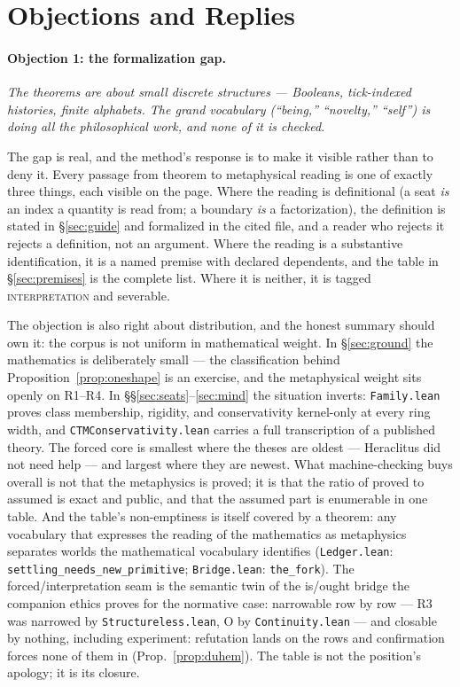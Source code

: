 \documentclass[11pt]{article}
\theoremstyle{remark}
\newcommand{\lf}[1]{\texttt{#1}}       %
\newcommand{\tagi}{\textsc{interpretation}}
\begin{document}
\section{Objections and Replies}\label{sec:objections}

\paragraph{Objection 1: the formalization gap.} \emph{The theorems are about small discrete structures --- Booleans, tick-indexed histories, finite alphabets. The grand vocabulary (``being,'' ``novelty,'' ``self'') is doing all the philosophical work, and none of it is checked.}

The gap is real, and the method's response is to make it visible rather than to deny it. Every passage from theorem to metaphysical reading is one of exactly three things, each visible on the page. Where the reading is definitional (a seat \emph{is} an index a quantity is read from; a boundary \emph{is} a factorization), the definition is stated in \S\ref{sec:guide} and formalized in the cited file, and a reader who rejects it rejects a definition, not an argument. Where the reading is a substantive identification, it is a named premise with declared dependents, and the table in \S\ref{sec:premises} is the complete list. Where it is neither, it is tagged \tagi{} and severable.

The objection is also right about distribution, and the honest summary should own it: the corpus is not uniform in mathematical weight. In \S\ref{sec:ground} the mathematics is deliberately small --- the classification behind Proposition~\ref{prop:oneshape} is an exercise, and the metaphysical weight sits openly on R1--R4. In \S\S\ref{sec:seats}--\ref{sec:mind} the situation inverts: \lf{Family.lean} proves class membership, rigidity, and conservativity kernel-only at every ring width, and \lf{CTMConservativity.lean} carries a full transcription of a published theory. The forced core is smallest where the theses are oldest --- Heraclitus did not need help --- and largest where they are newest. What machine-checking buys overall is not that the metaphysics is proved; it is that the ratio of proved to assumed is exact and public, and that the assumed part is enumerable in one table. And the table's non-emptiness is itself covered by a theorem: any vocabulary that expresses the reading of the mathematics as metaphysics separates worlds the mathematical vocabulary identifies (\lf{Ledger.lean}: \lf{settling\_needs\_new\_primitive}; \lf{Bridge.lean}: \lf{the\_fork}). The forced/interpretation seam is the semantic twin of the is/ought bridge the companion ethics proves for the normative case: narrowable row by row --- R3 was narrowed by \lf{Structureless.lean}, O by \lf{Continuity.lean} --- and closable by nothing, including experiment: refutation lands on the rows and confirmation forces none of them in (Prop.~\ref{prop:duhem}). The table is not the position's apology; it is its closure.
\end{document}
